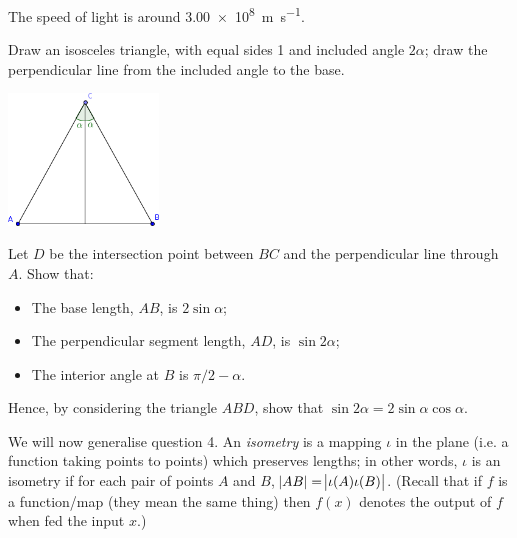 \documentclass[answers]{exam}
\begin{document}
\begin{questions}
            The speed of light is around \SI{3.00e8}{\metre\per\second}.


  \question Draw an isosceles triangle, with equal sides 1 and included angle $ 2\alpha $; draw the perpendicular line from the included
            angle to the base.
            \begin{center}
              \includegraphics[width=0.3\textwidth]{exercises-2-1}
            \end{center}
            Let $ D $ be the intersection point between $ BC $ and the perpendicular line through $ A $. Show that:
            \begin{itemize}
              \item The base length, $ AB $, is $ 2\sin\alpha $;
              \item The perpendicular segment length, $ AD $, is $ \sin 2\alpha $;
              \item The interior angle at $ B $ is $ \pi/2 - \alpha $.
            \end{itemize}
            Hence, by considering the triangle $ ABD $, show that $ \sin 2\alpha = 2\sin \alpha \cos \alpha $.

  \question We will now generalise question 4. An \emph{isometry} is a mapping $ \iota $ in the plane (i.e. a function taking points
            to points) which preserves lengths; in other words, $ \iota $ is an isometry if for each pair of
            points $ A $ and $ B $, $ \abs{AB} = \abs{\iota(A)\iota(B)} $. (Recall that if $ f $ is a function/map (they mean the same
            thing) then $ f(x) $ denotes the output of $ f $ when fed the input $ x $.)
    \begin{parts}

\end{parts}
\end{questions}
\end{document}
